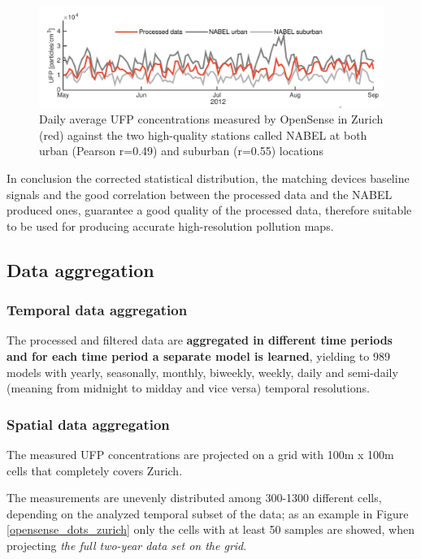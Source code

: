 \documentclass[11pt,a4paper,titlepage]{book}
\begin{document}
\begin{figure}[ht]
    \centering
    \includegraphics[width=\textwidth]{imgs/ch_2/OpenSense_processed_vs_NABEL.png}
    \caption{Daily average UFP concentrations measured by OpenSense in Zurich (red) against the two high-quality stations called NABEL at both urban (Pearson r=0.49) and suburban (r=0.55) locations} 
    \label{opensense_processed_vs_NABEL}
\end{figure}
In conclusion the corrected statistical distribution, the matching devices baseline signals and the good correlation between the processed data and the NABEL produced ones, guarantee a good quality of the processed data, therefore suitable to be used for producing accurate high-resolution pollution maps.

\subsection{Data aggregation}
\subsubsection{Temporal data aggregation}
The processed and filtered data are \textbf{aggregated in different time periods and for each time period a separate model is learned}, yielding to 989 models with yearly, seasonally, monthly, biweekly, weekly, daily and semi-daily (meaning from midnight to midday and vice versa) temporal resolutions.

\subsubsection{Spatial data aggregation}
The measured UFP concentrations are projected on a grid with 100m x 100m cells that completely covers Zurich. 

The measurements are unevenly distributed among 300-1300 different cells, depending on the analyzed temporal subset of the data; as an example in Figure \ref{opensense_dots_zurich} only the cells with at least 50 samples are showed, when projecting \textit{the full two-year data set on the grid}.
\end{document}
